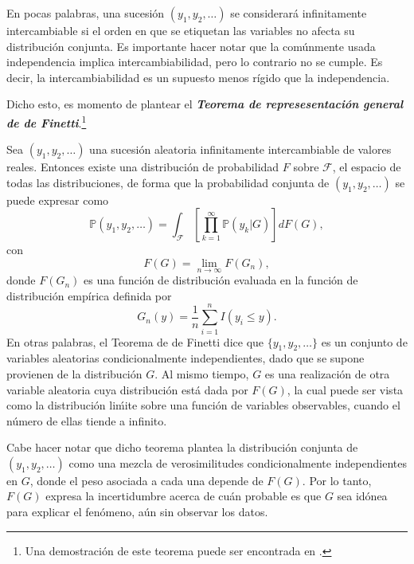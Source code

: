 En pocas palabras, una sucesi\'on $(y_1,y_2,\ldots)$ se considerar\'a infinitamente intercambiable si el orden en que se etiquetan las variables no afecta su distribuci\'on conjunta. Es importante hacer notar que la com\'unmente usada independencia implica intercambiabilidad, pero lo contrario no se cumple. Es decir, la intercambiabilidad es un supuesto menos r\'igido que la independencia.

Dicho esto, es momento de plantear el \textbf{\textit{Teorema de represesentaci\'on general de de Finetti}}.\footnote{Una demostraci\'on de este teorema puede ser encontrada en \cite{Schervish_TheoryStats}.}

\begin{theorem*}
    Sea $(y_1,y_2,\ldots)$ una sucesi\'on aleatoria infinitamente intercambiable de valores reales. Entonces existe una distribuci\'on de probabilidad $F$ sobre $\mathcal{F}$, el espacio de todas las distribuciones, de forma que la probabilidad conjunta de $(y_1,y_2,\ldots)$ se puede expresar como
    \begin{equation*}
        \mathbb{P}(y_1,y_2,\ldots) =
        \int_{\mathcal{F}}\left[\prod_{k=1}^\infty \mathbb{P}(y_k|G)\right]dF(G),
    \end{equation*}
    con
    \begin{equation*}
        F(G) = \lim_{n \to \infty} F(G_n),
    \end{equation*}
    donde $F(G_n)$ es una funci\'on de distribuci\'on evaluada en la funci\'on de distribuci\'on emp\'irica definida por
    \begin{equation*}
        G_n(y) = \frac{1}{n} \sum_{i=1}^n I(y_i \leq y).
    \end{equation*}
    En otras palabras, el Teorema de de Finetti dice que $\{y_1,y_2,\ldots\}$ es un conjunto de variables aleatorias condicionalmente independientes, dado que se supone provienen de la distribuci\'on $G$. Al mismo tiempo, $G$ es una realizaci\'on de otra variable aleatoria cuya distribuci\'on est\'a dada por $F(G)$, la cual puede ser vista como la distribuci\'on li\'mite sobre una funci\'on de variables observables, cuando el n\'umero de ellas tiende a infinito.
\end{theorem*}

Cabe hacer notar que dicho teorema plantea la distribuci\'on conjunta de $(y_1,y_2,\ldots)$ como una mezcla de verosimilitudes condicionalmente independientes en $G$, donde el peso asociada a cada una depende de $F(G)$. Por lo tanto, $F(G)$ expresa la incertidumbre acerca de cu\'an probable es que $G$ sea id\'onea para explicar el fen\'omeno, a\'un sin observar los datos.

